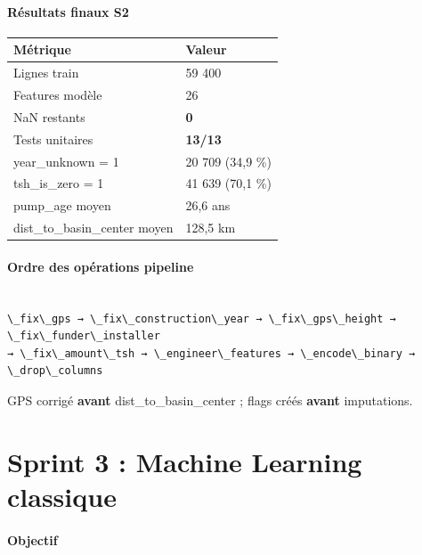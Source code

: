 \documentclass[11pt,a4paper]{report}
\begin{document}
\subsubsection{Résultats finaux S2}



\begin{longtable}{@{}ll@{}}
\toprule
Métrique & Valeur \\
\midrule
Lignes train & 59 400 \\
Features modèle & 26 \\
NaN restants & \textbf{0} \\
Tests unitaires & \textbf{13/13} \\
year\_unknown = 1 & 20 709 (34,9 \%) \\
tsh\_is\_zero = 1 & 41 639 (70,1 \%) \\
pump\_age moyen & 26,6 ans \\
dist\_to\_basin\_center moyen & 128,5 km \\
\bottomrule
\end{longtable}




\subsubsection{Ordre des opérations pipeline}



\begin{lstlisting}

\_fix\_gps → \_fix\_construction\_year → \_fix\_gps\_height → \_fix\_funder\_installer
→ \_fix\_amount\_tsh → \_engineer\_features → \_encode\_binary → \_drop\_columns

\end{lstlisting}



GPS corrigé \textbf{avant} dist\_to\_basin\_center ; flags créés \textbf{avant} imputations.





\chapter{Sprint 3 : Machine Learning classique}



\subsubsection{Objectif}
\end{document}
